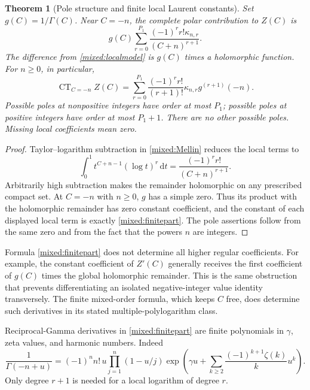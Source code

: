 \documentclass[11pt]{article}
\numberwithin{equation}{section}
\theoremstyle{plain}
\newtheorem{theorem}{Theorem}[section]
\theoremstyle{definition}
\theoremstyle{remark}
\DeclareMathOperator{\CT}{CT}
\newcommand{\dd}{\,\mathrm d}
\begin{document}
\begin{theorem}[Pole structure and finite local Laurent constants]
\label{mixed:localtheorem}
Set $g(C)=1/\Gamma(C)$. Near $C=-n$, the complete polar contribution
to $Z(C)$ is
\begin{equation}\label{mixed:localmodel}
        g(C)\sum_{r=0}^{P_1}
              \frac{(-1)^r r!\kappa_{n,r}}{(C+n)^{r+1}}.
\end{equation}
The difference from \eqref{mixed:localmodel} is $g(C)$ times a
holomorphic function. For $n\ge0$, in particular,
\begin{equation}\label{mixed:finitepart}
 \boxed{\displaystyle
 \CT_{C=-n} Z(C)=
     \sum_{r=0}^{P_1}\frac{(-1)^r r!}{(r+1)!}
                           \kappa_{n,r}g^{(r+1)}(-n).}
\end{equation}
Possible poles at nonpositive integers have order at most $P_1$;
possible poles at positive integers have order at most $P_1+1$.
There are no other possible poles. Missing local coefficients mean zero.
\end{theorem}
\begin{proof}
Taylor--logarithm subtraction in \eqref{mixed:Mellin} reduces the
local terms to
\[
 \int_0^1t^{C+n-1}(\log t)^r\dd t
                  =\frac{(-1)^r r!}{(C+n)^{r+1}}.
\]
Arbitrarily high subtraction makes the remainder holomorphic on any
prescribed compact set. At $C=-n$ with $n\ge0$, $g$ has a simple
zero. Thus its product with the holomorphic remainder has zero
constant coefficient, and the constant of each displayed local term
is exactly \eqref{mixed:finitepart}. The pole assertions follow from
the same zero and from the fact that the powers $n$ are integers.
\end{proof}

Formula \eqref{mixed:finitepart} does not determine all higher
regular coefficients. For example, the constant coefficient of
$Z'(C)$ generally receives the first coefficient of $g(C)$ times
the global holomorphic remainder. This is the same obstruction that
prevents differentiating an isolated negative-integer value identity
transversely. The finite mixed-order formula, which keeps $C$ free,
does determine such derivatives in its stated multiple-polylogarithm
class.

Reciprocal-Gamma derivatives in \eqref{mixed:finitepart} are finite
polynomials in $\gamma$, zeta values, and harmonic numbers. Indeed
\begin{equation}\label{mixed:reciprocalgamma}
 \frac1{\Gamma(-n+u)}=
       (-1)^n n!\,u\prod_{j=1}^n(1-u/j)
       \exp\left(\gamma u+
             \sum_{k\ge2}\frac{(-1)^{k+1}\zeta(k)}k u^k\right).
\end{equation}
Only degree $r+1$ is needed for a local logarithm of degree $r$.
\end{document}
